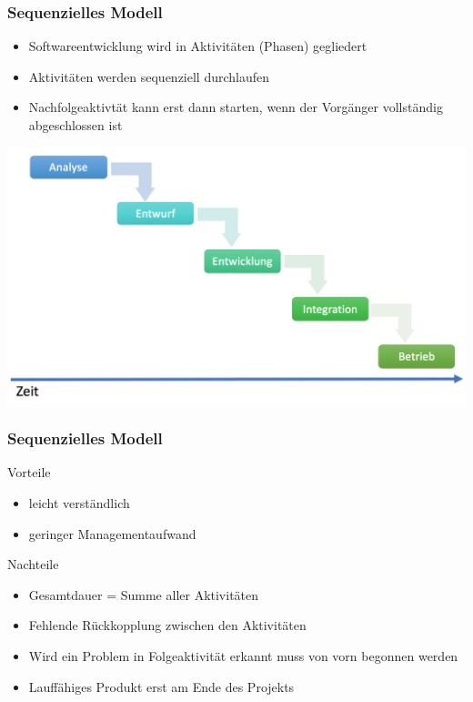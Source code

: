 \begin{frame}
\frametitle{Sequenzielles Modell}
	\begin{itemize}
		\item Softwareentwicklung wird in Aktivitäten (Phasen) gegliedert
		\item Aktivitäten werden sequenziell durchlaufen
		\item Nachfolgeaktivtät kann erst dann starten, wenn der Vorgänger vollständig 
		abgeschlossen ist
	\end{itemize}
	\center\includegraphics[width=1\textwidth,
		keepaspectratio=true]{bilder/sequenzielles_model.png}
\end{frame}

\begin{frame}
\frametitle{Sequenzielles Modell}
	Vorteile
	\begin{itemize}
		\item leicht verständlich
		\item geringer Managementaufwand
	\end{itemize}
	\bigskip
	Nachteile
	\begin{itemize}
		\item Gesamtdauer = Summe aller Aktivitäten
		\item Fehlende Rückkopplung zwischen den Aktivitäten
		\item Wird ein Problem in Folgeaktivität erkannt 
		muss von vorn begonnen werden
		\item Lauffähiges Produkt erst am Ende des Projekts
	\end{itemize}
\end{frame}

